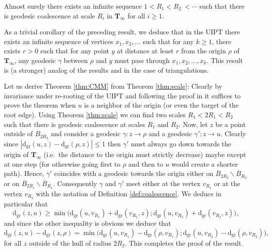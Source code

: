 \documentclass[AHL,XML,longabstracts,Unicode,NoSaveZebib]{cedram}
\begin{document}
\begin{theorem}  \label{thm:scale}Almost surely there exists an infinite sequence $1<R_{1}<R_{2}~<\cdots$ such that there is geodesic coalescence at scale $R_{i}$ in $\mathbf{T}_{\infty}$ for all $i \geq 1$.\end{theorem}
\begin{remark}
As a trivial corollary of the preceding result, we deduce that in the UIPT there exists an infinite sequence of vertices $x_{1},x_{2}, \dots$ such that for any $k \geq 1$, there exists $r>0$ such that for any point $y$ at distance at least $r$ from the origin $\rho$ of $\mathbf{T}_{\infty}$, any geodesic $\gamma$ between $\rho$ and $y$ must pass through $x_{1},x_{2}, \dots , x_{k}$. This result is (a stronger) analog of the results \cite[Lemma 3.3]{CMM10} and \cite[Theorem 3.4]{CMM10} in the case of triangulations.
\end{remark}
Let us derive Theorem \ref{thm:CMM} from Theorem \ref{thm:scale}:
  Clearly by invariance under re-rooting of the UIPT and following the proof in \cite{CMM10} it suffices to prove the theorem when $u$ is a neighbor of the origin (or even the target of the root edge). Using Theorem \ref{thm:scale} we can find two scales $R_{1}< 2 R_{1} < R_{2}$ such that there is geodesic coalescence at scales $R_{1}$ and $R_{2}$. Now, let $z$ be a point outside of $\overline{B}_{2R_{2}}$ and consider a geodesic $\gamma : z \to \rho$ and a geodesic $\gamma' : z \to u$. Clearly since $ |\mathrm{d_{gr}}(u,z) - \mathrm{d_{gr}}(\rho,z)| \leq 1$ then $\gamma'$ must always go down towards the origin of $\mathbf{T}_{\infty}$ (i.e.~the distance to the origin must strictly decrease) maybe except at one step (for otherwise going first to $\rho$ and then to $u$ would create a shorter path). Hence, $\gamma'$ coincides with a geodesic towards the origin either on $ \overline{B}_{2R_{2}} \backslash \overline{B}_{R_{2}}$ or on $ \overline{B}_{2R_{1}} \backslash \overline{B}_{R_{1}}$. Consequently $\gamma$ and $\gamma'$ meet either at the vertex $v_{R_{1}}$ or at the vertex $v_{R_{2}}$ with the notation of Definition \ref{def:coalescence}. We deduce in particular that
$$ \mathrm{d_{gr}}(z, u) \geq \min \big( \mathrm{d_{gr}}(u,v_{R_{1}}) + \mathrm{d_{gr}}(v_{R_{1}},z) ; \mathrm{d_{gr}}(u,v_{R_{2}}) + \mathrm{d_{gr}}(v_{R_{2}},z)\big),$$
 and since the other inequality is obvious we deduce that
 $$ \mathrm{d_{gr}}(z,u)-\mathrm{d_{gr}}(z,\rho) = \min \big( \mathrm{d_{gr}}(u,v_{R_{1}})- \mathrm{d_{gr}}(\rho,v_{R_{1}}) ; \mathrm{d_{gr}}(u,v_{R_{2}})- \mathrm{d_{gr}}(\rho,v_{R_{2}})\big),$$ for all $z$ outside of the hull of radius $2R_{2}$. This completes the proof of the result. \endproof
\end{document}
